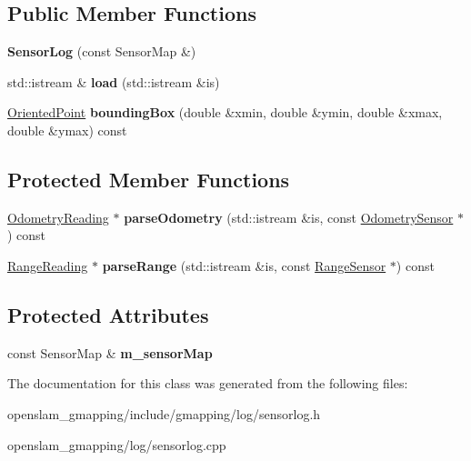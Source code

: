 \subsection*{Public Member Functions}
\begin{DoxyCompactItemize}
\item 
\mbox{\label{classGMapping_1_1SensorLog_ac4a889158ae6ccb35890cef3b701d00f}} 
{\bfseries Sensor\+Log} (const Sensor\+Map \&)
\item 
\mbox{\label{classGMapping_1_1SensorLog_a0e48499de876774339e5d64299ce01e7}} 
std\+::istream \& {\bfseries load} (std\+::istream \&is)
\item 
\mbox{\label{classGMapping_1_1SensorLog_a7a5c9ad7125e1173bd2eb93c00fe24ca}} 
\hyperlink{structGMapping_1_1orientedpoint}{Oriented\+Point} {\bfseries bounding\+Box} (double \&xmin, double \&ymin, double \&xmax, double \&ymax) const
\end{DoxyCompactItemize}
\subsection*{Protected Member Functions}
\begin{DoxyCompactItemize}
\item 
\mbox{\label{classGMapping_1_1SensorLog_aebe59c0b3ae95ba336db058085e945d4}} 
\hyperlink{classGMapping_1_1OdometryReading}{Odometry\+Reading} $\ast$ {\bfseries parse\+Odometry} (std\+::istream \&is, const \hyperlink{classGMapping_1_1OdometrySensor}{Odometry\+Sensor} $\ast$) const
\item 
\mbox{\label{classGMapping_1_1SensorLog_ab0cf24fe49e6bb020c64ede8d3b619ce}} 
\hyperlink{classGMapping_1_1RangeReading}{Range\+Reading} $\ast$ {\bfseries parse\+Range} (std\+::istream \&is, const \hyperlink{classGMapping_1_1RangeSensor}{Range\+Sensor} $\ast$) const
\end{DoxyCompactItemize}
\subsection*{Protected Attributes}
\begin{DoxyCompactItemize}
\item 
\mbox{\label{classGMapping_1_1SensorLog_a1b309acc3cacc72c26d4f67da2cf5d77}} 
const Sensor\+Map \& {\bfseries m\+\_\+sensor\+Map}
\end{DoxyCompactItemize}


The documentation for this class was generated from the following files\+:\begin{DoxyCompactItemize}
\item 
openslam\+\_\+gmapping/include/gmapping/log/sensorlog.\+h\item 
openslam\+\_\+gmapping/log/sensorlog.\+cpp\end{DoxyCompactItemize}
